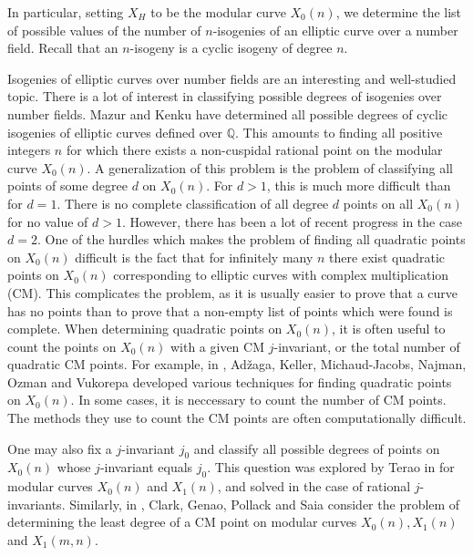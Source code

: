 \documentclass[10pt,leqno]{amsart}
\newcommand{\Q}{\mathbb{Q}}
\theoremstyle{definition}
\theoremstyle{remark}
\numberwithin{theorem}{section}
\begin{document}
In particular, setting $X_H$ to be the modular curve $X_0(n)$, we determine the list of possible values of the number of $n$-isogenies of an elliptic curve over a number field. Recall that an $n$-isogeny is a cyclic isogeny of degree $n$. 

Isogenies of elliptic curves over number fields are an interesting and well-studied topic. There is a lot of interest in classifying possible degrees of isogenies over number fields. Mazur \cite{Mazur} and Kenku \cite{kenku39, kenku169, kenku65, Kenku} have determined all possible degrees of cyclic isogenies of elliptic curves defined over $\Q$. This amounts to finding all positive integers $n$ for which there exists a non-cuspidal rational point on the modular curve $X_0(n)$. A generalization of this problem is the problem of classifying all points of some degree $d$ on $X_0(n)$. For $d>1$, this is much more difficult than for $d=1$. There is no complete classification of all degree $d$ points on all $X_0(n)$ for no value of $d>1$.  However, there has been a lot of recent progress in the case $d=2$. One of the hurdles which makes the problem of finding all quadratic points on $X_0(n)$ difficult is the fact that for infinitely many $n$ there exist quadratic points on $X_0(n)$ corresponding to elliptic curves with complex multiplication (CM). This complicates the problem, as it is usually easier to prove that a curve has no points than to prove that a non-empty list of points which were found is complete. When determining quadratic points on $X_0(n)$, it is often useful to count the points on $X_0(n)$ with a given CM $j$-invariant, or the total number of quadratic CM points. For example, in \cite{nikola}, Adžaga, Keller, Michaud-Jacobs, Najman, Ozman and Vukorepa developed various techniques for finding quadratic points on $X_0(n)$. In some cases, it is neccessary to count the number of CM points. The methods they use to count the CM points are often computationally difficult.

One may also fix a $j$-invariant $j_0$ and classify all possible degrees of points on $X_0(n)$ whose $j$-invariant equals $j_0$. This question was explored by Terao in \cite{kenji} for modular curves $X_0(n)$ and $X_1(n)$, and solved in the case of rational $j$-invariants. Similarly, in \cite{leastcmdeg}, Clark, Genao, Pollack and Saia consider the problem of determining the least degree of a CM point on modular curves $X_0(n), X_1(n)$ and $X_1(m,n)$.  
\end{document}
